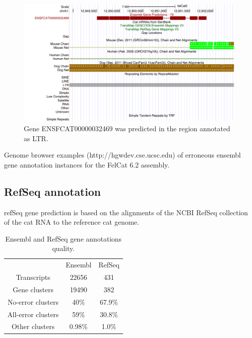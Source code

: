 \documentclass{article}
\begin{document}
\begin{figure}[h]
\centering
\includegraphics[width=\textwidth]{images/hgt_hgwdev_ede4_52c4e0.pdf}
\caption{Gene ENSFCAT00000032469 was predicted in the region annotated as LTR.}
\label{fig:gene_in_ltr}
\end{figure}

Genome browser examples (http://hgwdev.cse.ucsc.edu) of erroneous ensembl gene annotation instances for the FelCat 6.2 assembly.

\subsection{RefSeq annotation}
refSeq gene prediction is based on the alignments of the NCBI RefSeq collection of the cat RNA to the reference cat genome.

\begin{table}
\centering
\begin{tabular}{| c | c | c |}
\hline
&Ensembl&RefSeq\\

Transcripts& 22656 & 431\\

Gene clusters& 19490 & 382\\

No-error clusters & 40\% & 67.9\%\\

All-error clusters& 59\% & 30.8\%\\

Other clusters& 0.98\% & 1.0\%\\
\hline
\end{tabular}
\caption{Ensembl and RefSeq gene annotations quality.}
\label{table:ensembl_refseq_stats}
\end{table}
\end{document}
